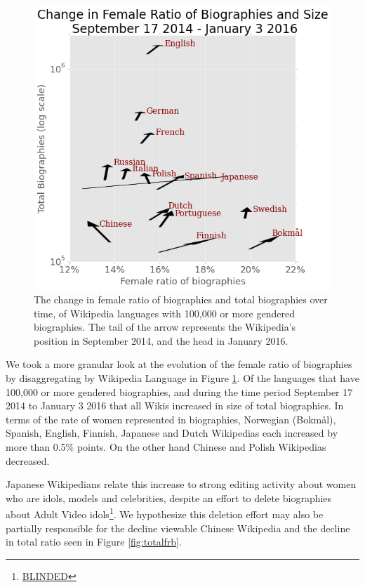 \documentclass{sig-alternate-05-2015}
\begin{document}
\begin{figure}
\includegraphics[width=\columnwidth]{figures/arrowplot_flippedaxes.png} 
\caption{The change in female ratio of biographies and total biographies over time, of Wikipedia languages with 100,000 or more gendered biographies. The tail of the arrow represents the Wikipedia's position in September 2014, and the head in January 2016.}
\label{fig:changefrb}
\end{figure}

We took a more granular look at the evolution of the female ratio of biographies by disaggregating by Wikipedia Language in Figure \ref{fig:changefrb}. Of the languages that have 100,000 or more gendered biographies, and during the time period September 17 2014 to January 3 2016 that all Wikis increased in size of total biographies. In terms of the rate of women represented in biographies, Norwegian (Bokm\aa l), Spanish, English, Finnish, Japanese and Dutch Wikipedias each increased by more than 0.5\% points. On the other hand Chinese and Polish Wikipedias decreased. 

Japanese Wikipedians relate this increase to strong editing activity about women who are idols, models and celebrities, despite an effort to delete biographies about Adult Video idols\footnote{\url{BLINDED}}. We hypothesize this deletion effort may also be partially responsible for the decline viewable Chinese Wikipedia and the decline in total ratio seen in Figure \ref{fig:totalfrb}.
\end{document}
